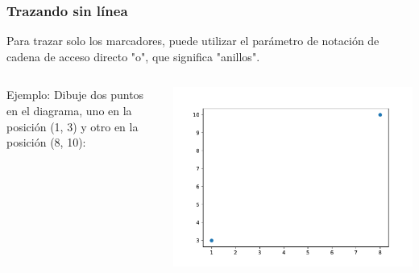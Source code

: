 \begin{frame}[fragile]
  \frametitle{Trazando sin línea}

  \vspace{\baselineskip}
  Para trazar solo los marcadores, puede utilizar el parámetro
  de notación de cadena de acceso directo "o", que significa "anillos".
  \begin{columns}
        \begin{exampleblock}{Ejemplo:}
          Dibuje dos puntos en el diagrama, uno en la
          posición (1, 3) y otro en la posición (8, 10):
          
        \end{exampleblock}
      \pausa
      \parbox{\textwidth}{\includegraphics[width=\linewidth]{ejemplos/e03.pdf}}
  \end{columns}
\end{frame}

